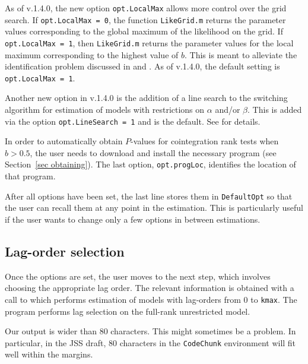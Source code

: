 \documentclass[article]{jss}
\newcommand{\fct}[1]{\code{#1()}}
\begin{document}
As of v.1.4.0, the new option \verb|opt.LocalMax| allows more control over the grid search. If \verb|opt.LocalMax = 0|, the function \verb|LikeGrid.m| returns the parameter values corresponding to the global maximum of the likelihood on the grid. If \verb|opt.LocalMax = 1|, then \verb|LikeGrid.m| returns the parameter values for the local maximum corresponding to the highest value of $b$. This is meant to alleviate the identification problem discussed in \citet[Section 2.3]{johniel2010} and \cite{Carlini2014}. As of v.1.4.0, the default setting is \verb|opt.LocalMax = 1|.

Another new option in v.1.4.0 is the addition of a line search to the switching algorithm for estimation of models with restrictions on $\alpha$ and/or $\beta$. This is added via the option \verb|opt.LineSearch = 1| and is the default. See \citet[Section 2.2]{Doornik2016} for details.

In order to automatically obtain $P$-values for cointegration rank tests when $b>0.5$, the user needs to download and install the necessary program (see Section~\ref{sec obtaining}). The last option, \verb|opt.progLoc|, identifies the location of that program.

After all options have been set, the last line 
stores them in \verb|DefaultOpt| so that the user can recall them at any point in the estimation. This is particularly useful if the user wants to change only a few options in between estimations.


\subsection{Lag-order selection}

Once the options are set, the user moves to the next step, which involves choosing the appropriate lag order. The relevant information is obtained with a call to \fct{FCVARlagSelect}
which performs estimation of models with lag-orders from $0$ to \verb|kmax|. The program performs lag selection on the full-rank unrestricted model. 

\begin{leftbar}
Our output is wider than 80 characters. This might sometimes be a problem. 
In particular, in the JSS draft, 80 characters in the \verb|CodeChunk| environment will fit well within the margins.
\end{leftbar}
\end{document}
